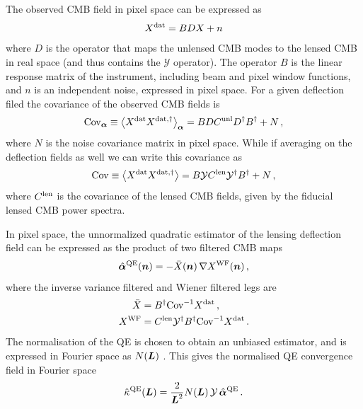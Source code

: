 \documentclass[prd, superscriptaddress, tightenlines, longbibliography, nofootinbib, eqsecnum, amsfonts, amsmath, floatfix, twocolumn, notitlepage]{revtex4-2}
\newcommand{\Cov}[0]{ {\rm{Cov}} }
\begin{document}
The observed CMB field in pixel space can be expressed as 
\begin{equation}
    X^{\rm dat} = BDX + n
\end{equation}
where $D$ is the operator that maps the unlensed CMB modes to the lensed CMB in real space (and thus contains the $\mathcal{Y}$ operator). The operator $B$ is the linear response matrix of the instrument, including beam and pixel window functions, and $n$ is an independent noise, expressed in pixel space. 
For a given deflection filed the covariance of the observed CMB fields is
\begin{equation}
    \Cov_{\valpha} \equiv \left<X^{\rm dat} X^{\rm dat, \dagger} \right>_{\valpha}  = BDC^{\rm unl} D^\dagger B^\dagger + N \, ,
\end{equation}
where $N$ is the noise covariance matrix in pixel space. 
While if averaging on the deflection fields as well we can write this covariance as 
\begin{equation}
    \Cov \equiv \left<X^{\rm dat} X^{\rm dat, \dagger} \right> = B \mathcal{Y} C^{\rm len} \mathcal{Y}^\dagger B^\dagger + N \, ,
\end{equation}
where $C^{\rm len}$ is the covariance of the lensed CMB fields, given by the fiducial lensed CMB power spectra. 

In pixel space, the unnormalized quadratic estimator of the lensing deflection field can be expressed as the product of two filtered CMB maps
\begin{equation}\label{Eq:QE}
    \hat {{\boldsymbol{\alpha}}}^{\rm QE}({\mbox{\boldmath{$n$}}}) = - \bar X({\mbox{\boldmath{$n$}}}) \, \nabla X^{\rm WF}({\mbox{\boldmath{$n$}}}) \, ,
\end{equation}
where the inverse variance filtered and Wiener filtered legs are
\begin{equation}
    \begin{split}
        \bar X &= B^{\dagger} \Cov^{-1} X^{\rm dat} \, , \\
        X^{\rm WF} &= C^{\rm len}  \mathcal{Y}^\dagger B^{\dagger} \Cov^{-1} X^{\rm dat} \, .
    \end{split}
\end{equation}
The normalisation of the QE is chosen to obtain an unbiased estimator, and is expressed in Fourier space as $N({\mbox{\boldmath{$L$}}})$ \cite{Hu:2001kj}. 
This gives the normalised QE convergence field in Fourier space
\begin{equation}
    \hat \kappa^{\rm QE}({\mbox{\boldmath{$L$}}}) = \frac{2}{{\mbox{\boldmath{$L$}}}^2} N({\mbox{\boldmath{$L$}}}) \, \mathcal{Y} \, \hat {{\boldsymbol{\alpha}}}^{\rm QE} \, .
\end{equation}
\end{document}
